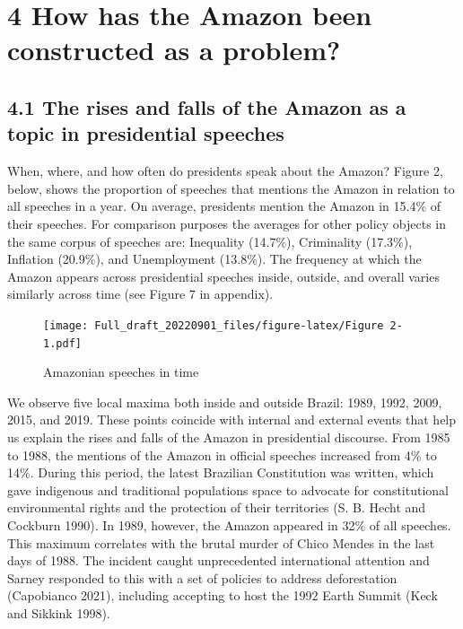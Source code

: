 \documentclass[
  12pt,
]{article}
\begin{document}
\hypertarget{how-has-the-amazon-been-constructed-as-a-problem}{%
\section{4 How has the Amazon been constructed as a
problem?}\label{how-has-the-amazon-been-constructed-as-a-problem}}

\hypertarget{the-rises-and-falls-of-the-amazon-as-a-topic-in-presidential-speeches}{%
\subsection{4.1 The rises and falls of the Amazon as a topic in
presidential
speeches}\label{the-rises-and-falls-of-the-amazon-as-a-topic-in-presidential-speeches}}

When, where, and how often do presidents speak about the Amazon? Figure
2, below, shows the proportion of speeches that mentions the Amazon in
relation to all speeches in a year. On average, presidents mention the
Amazon in 15.4\% of their speeches. For comparison purposes the averages
for other policy objects in the same corpus of speeches are: Inequality
(14.7\%), Criminality (17.3\%), Inflation (20.9\%), and Unemployment
(13.8\%). The frequency at which the Amazon appears across presidential
speeches inside, outside, and overall varies similarly across time (see
Figure 7 in appendix).

\begin{figure}
\centering
\texttt{[image: Full\_draft\_20220901\_files/figure-latex/Figure 2-1.pdf]}
\caption{Amazonian speeches in time}
\end{figure}

We observe five local maxima both inside and outside Brazil: 1989, 1992,
2009, 2015, and 2019. These points coincide with internal and external
events that help us explain the rises and falls of the Amazon in
presidential discourse. From 1985 to 1988, the mentions of the Amazon in
official speeches increased from 4\% to 14\%. During this period, the
latest Brazilian Constitution was written, which gave indigenous and
traditional populations space to advocate for constitutional
environmental rights and the protection of their territories (S. B.
Hecht and Cockburn 1990). In 1989, however, the Amazon appeared in 32\%
of all speeches. This maximum correlates with the brutal murder of Chico
Mendes in the last days of 1988. The incident caught unprecedented
international attention and Sarney responded to this with a set of
policies to address deforestation (Capobianco 2021), including accepting
to host the 1992 Earth Summit (Keck and Sikkink 1998).
\end{document}
